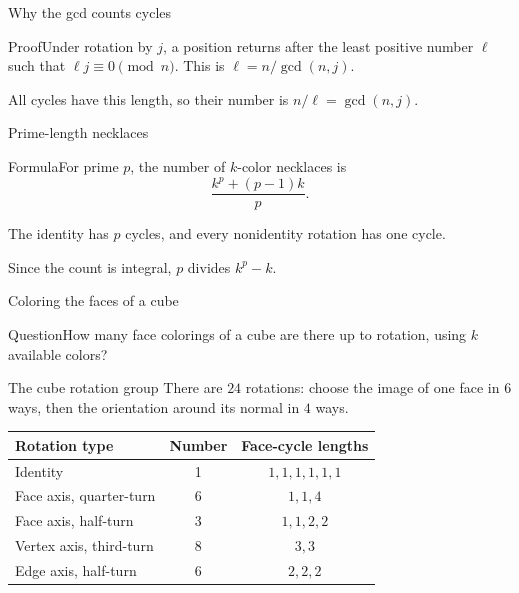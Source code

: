 \documentclass[aspectratio=169,11pt]{beamer}
\newcommand{\Thm}[2]{\begin{block}{#1}#2\end{block}}
\renewcommand{\Proof}[1]{\begin{block}{Proof}\normalsize #1\end{block}}
\newcommand{\Question}[1]{\begin{block}{Question}#1\end{block}}
\newcommand{\gap}{\par\medskip}
\begin{document}
\begin{frame}{Why the gcd counts cycles}
\large
\Proof{Under rotation by $j$, a position returns after the least positive number $\ell$ such that $\ell j\equiv0\pmod n$. This is $\ell=n/\gcd(n,j)$.\gap All cycles have this length, so their number is $n/\ell=\gcd(n,j)$.}
\end{frame}
\begin{frame}{Prime-length necklaces}
\large
\Thm{Formula}{For prime $p$, the number of $k$-color necklaces is
\[\frac{k^p+(p-1)k}{p}.\]}
\gap The identity has $p$ cycles, and every nonidentity rotation has one cycle.
\gap Since the count is integral, $p$ divides $k^p-k$.
\end{frame}
\begin{frame}{Coloring the faces of a cube}
\large
\Question{How many face colorings of a cube are there up to rotation, using $k$ available colors?}
\begin{center}\end{center}
\end{frame}
\begin{frame}{The cube rotation group}
\large
\normalsize
There are $24$ rotations: choose the image of one face in $6$ ways, then the orientation around its normal in $4$ ways.
\begin{center}\renewcommand{\arraystretch}{1.3}
\begin{tabular}{lcc}
Rotation type & Number & Face-cycle lengths\\\hline
Identity&1&$1,1,1,1,1,1$\\
Face axis, quarter-turn&6&$1,1,4$\\
Face axis, half-turn&3&$1,1,2,2$\\
Vertex axis, third-turn&8&$3,3$\\
Edge axis, half-turn&6&$2,2,2$
\end{tabular}\end{center}
\end{frame}
\end{document}
